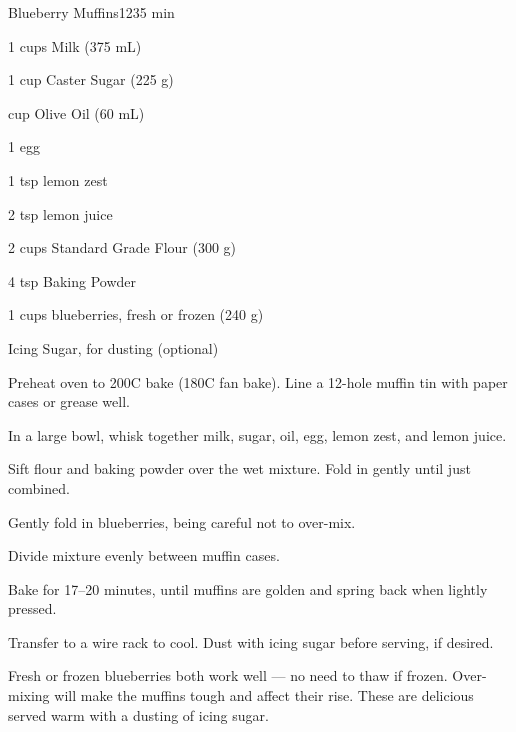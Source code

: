 \begin{recipebox}{Blueberry Muffins}{12}{35 min}
\begin{ingredients}
  \item 1  cups Milk (375 mL)
  \item 1 cup Caster Sugar (225 g)
  \item {} cup Olive Oil (60 mL)
  \item 1 egg
  \item 1 tsp lemon zest
  \item 2 tsp lemon juice
  \item 2 cups Standard Grade Flour (300 g)
  \item 4 tsp Baking Powder
  \item 1  cups blueberries, fresh or frozen (240 g)
  \item Icing Sugar, for dusting (optional)
\end{ingredients}

\begin{method}
  \item Preheat oven to 200\degree C bake (180\degree C fan bake). Line a 12-hole muffin tin with paper cases or grease well.
  \item In a large bowl, whisk together milk, sugar, oil, egg, lemon zest, and lemon juice.
  \item Sift flour and baking powder over the wet mixture. Fold in gently until just combined.
  \item Gently fold in blueberries, being careful not to over-mix.
  \item Divide mixture evenly between muffin cases.
  \item Bake for 17–20 minutes, until muffins are golden and spring back when lightly pressed.
  \item Transfer to a wire rack to cool. Dust with icing sugar before serving, if desired.
\end{method}

\begin{notes}
Fresh or frozen blueberries both work well — no need to thaw if frozen.  
Over-mixing will make the muffins tough and affect their rise.  
These are delicious served warm with a dusting of icing sugar.  
\end{notes}
\end{recipebox}

